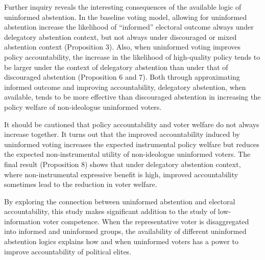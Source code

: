 \documentclass[letterpaper, 12pt]{article}
\begin{document}
    \par Further inquiry reveals the interesting consequences of the available logic of uninformed abstention. In the baseline voting model, allowing for uninformed abstention increase the likelihood of ``informed'' electoral outcome always under delegatory abstention context, but not always under discouraged or mixed abstention context (Proposition 3). Also, when uninformed voting improves policy accountability, the increase in the likelihood of high-quality policy tends to be larger under the context of delegatory abstention than under that of discouraged abstention (Proposition 6 and 7). Both through approximating informed outcome and improving accountability, delegatory abstention, when available, tends to be more effective than discouraged abstention in increasing the policy welfare of non-ideologue uninformed voters.
    
    \par It should be cautioned that policy accountability and voter welfare do not always increase together. It turns out that the improved accountability induced by uninformed voting increases the expected instrumental policy welfare but reduces the expected non-instrumental utility of non-ideologue uninformed voters. The final result (Proposition 8) shows that under delegatory abstention context, where non-instrumental expressive benefit is high, improved accountability sometimes lead to the reduction in voter welfare. 
    
    \par By exploring the connection between uninformed abstention and electoral accountability, this study makes significant addition to the study of low-information voter competence. When the representative voter is disaggregated into informed and uninformed groups, the availability of different uninformed abstention logics explains how and when uninformed voters has a power to improve accountability of political elites.
    
\end{document}
